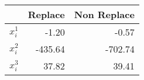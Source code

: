 \begin{tabular}{rrr}
  \hline
 & Replace & Non Replace \\ 
  \hline
$x_i^1$ & -1.20 & -0.57 \\ 
  $x_i^2$ & -435.64 & -702.74 \\ 
  $x_i^3$ & 37.82 & 39.41 \\ 
   \hline
\end{tabular}
